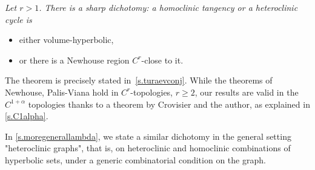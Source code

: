 \documentclass[11pt, a4paper]{amsart}
\theoremstyle{plain}
\theoremstyle{definition}
\theoremstyle{remark}
\numberwithin{equation}{section}         %
\begin{document}
 {\em Let $r>1$. There is a sharp dichotomy: a homoclinic tangency or a heteroclinic cycle is 
\begin{itemize}
\item either volume-hyperbolic,
\item or there is a Newhouse region $C^r$-close to it.
\end{itemize} }

\medskip

The theorem is precisely stated in~\cref{s.turaevconj}. While the theorems of Newhouse, Palis-Viana hold in $C^r$-topologies, $r\geq 2$, our results are valid in the $C^{1+\alpha}$ topologies thanks to a theorem by Crovisier and the author, as explained in \cref{s.C1alpha}.

In \cref{s.moregenerallambda}, we state a similar dichotomy in the general setting "heteroclinic graphs", that is, on heteroclinic and homoclinic combinations of hyperbolic sets, under a generic combinatorial condition on the graph. 
\end{document}
